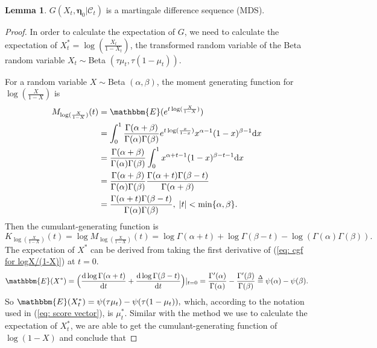 \documentclass{article}
\theoremstyle{definition}
\newtheorem{lemma}{Lemma}[section]
\begin{document}
\begin{lemma}
\label{lemma: G is MDS}
$G(X_t, \bm{\eta}_0|\mathcal{C}_t)$ is a martingale difference sequence (MDS).
\end{lemma}
\begin{proof}
In order to calculate the expectation of $G$, we need to calculate the expectation of $X_t^* = \log (\frac{X_t}{1-X_t})$, the transformed random variable of the Beta random variable $X_t \sim$Beta $(\tau \mu_t, \tau(1-\mu_t)).$

For a random variable $X \sim $Beta $(\alpha,\beta)$, the moment generating function for $\log(\frac{X}{1-X})$ is 
\begin{equation*}
\begin{aligned}
    M_{\log(\frac{X}{1-X})}(t) &= \mathbbm{E}(e^{t\log(\frac{X}{1-X})}) \\
    &=\int_0^1\frac{\Gamma(\alpha+\beta)}{\Gamma(\alpha)\Gamma(\beta)}e^{t\log(\frac{x}{1-x})}x^{\alpha-1}(1-x)^{\beta-1} \text{d}x \\
        &= \frac{\Gamma(\alpha+\beta)}{\Gamma(\alpha)\Gamma(\beta)}\int_0^1 x^{\alpha+t-1}(1-x)^{\beta-t-1} \text{d}x \\
        &= \frac{\Gamma(\alpha+\beta)}{\Gamma(\alpha)\Gamma(\beta)} \frac{\Gamma(\alpha+t)\Gamma(\beta-t)}{\Gamma(\alpha+\beta)} \\
        &=\frac{\Gamma(\alpha+t)\Gamma(\beta-t)}{\Gamma(\alpha)\Gamma(\beta)}, \;|t|<\min\{\alpha,\beta\}.
\end{aligned}
\end{equation*}
Then the cumulant-generating function is 
\begin{equation}
\label{eq: cgf for logX/(1-X)}
    K_{\log(\frac{X}{1-X})}(t) = \log M_{\log(\frac{X}{1-X})}(t) =\log \Gamma(\alpha+t)+\log \Gamma(\beta-t)-\log(\Gamma(\alpha)\Gamma(\beta)).
\end{equation}
The expectation of $X^*$ can be derived from taking the first derivative of (\ref{eq: cgf for logX/(1-X)}) at $t=0$.
\begin{equation*}
    \mathbbm{E}(X^*) = \Big (\frac{\text{d}\log \Gamma(\alpha+t)}{\text{d}t}+ \frac{\text{d}\log \Gamma(\beta-t)}{\text{d}t} \Big) |_{t = 0} = \frac{\Gamma'(\alpha)}{\Gamma(\alpha)}-\frac{\Gamma'(\beta)}{\Gamma(\beta)} \overset{\Delta}{=} \psi(\alpha)-\psi(\beta).
\end{equation*}
So $\mathbbm{E}(X^*_t) = \psi(\tau \mu_t)-\psi(\tau (1-\mu_t)),$ which, according to the notation used in (\ref{eq: score vector}), is $\mu^*_t$. Similar with the method we use to calculate the expectation of $X^*_t$, we are able to get the cumulant-generating function of $\log(1-X)$ and conclude that

\end{proof}
\end{document}
